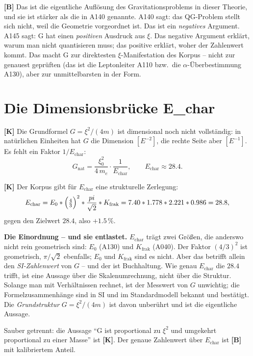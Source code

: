 \textbf{[B]} Das ist die eigentliche Auflösung des Gravitationsproblems in
dieser Theorie, und sie ist stärker als die in A140 genannte. A140 sagt: das
QG-Problem stellt sich nicht, weil die Geometrie vorgeordnet ist. Das ist ein
\emph{negatives} Argument. A145 sagt: G hat einen \emph{positiven} Ausdruck aus
$\xi$. Das negative Argument erklärt, warum man nicht quantisieren muss; das
positive erklärt, woher der Zahlenwert kommt. Das macht G zur direktesten
$\xi$-Manifestation des Korpus -- nicht zur genauest geprüften (das ist die
Leptonleiter A110 bzw.\ die $\alpha$-Überbestimmung A130), aber zur
unmittelbarsten in der Form.

\section{Die Dimensionsbrücke E\_char}

\textbf{[K]} Die Grundformel $G=\xi^2/(4m)$ ist dimensional noch nicht
vollständig: in natürlichen Einheiten hat $G$ die Dimension $[E^{-2}]$, die
rechte Seite aber $[E^{-1}]$. Es fehlt ein Faktor $1/E_\text{char}$:
\[
  G_\text{nat} = \frac{\xi_0^2}{4\,m_e}\cdot\frac{1}{E_\text{char}},
  \qquad E_\text{char}\approx 28{.}4 .
\]

\textbf{[K]} Der Korpus gibt für $E_\text{char}$ eine strukturelle Zerlegung:
\[
  E_\text{char} = E_0\cdot\Bigl(\tfrac43\Bigr)^2\cdot\frac{\pi}{\sqrt2}\cdot
  K_\text{frak} = 7{.}40\cdot 1{.}778\cdot 2{.}221\cdot 0{.}986 = 28{.}8 ,
\]
gegen den Zielwert $28{.}4$, also $+1{.}5\,\%$.

\textbf{Die Einordnung -- und sie entlastet.} $E_\text{char}$ trägt zwei Größen,
die anderswo nicht rein geometrisch sind: $E_0$ (A130) und $K_\text{frak}$
(A040). Der Faktor $(4/3)^2$ ist geometrisch, $\pi/\sqrt2$ ebenfalls; $E_0$ und
$K_\text{frak}$ sind es nicht. Aber das betrifft allein den \emph{SI-Zahlenwert}
von $G$ -- und der ist Buchhaltung. Wie genau $E_\text{char}$ die $28{.}4$
trifft, ist eine Aussage über die Skalenumrechnung, nicht über die Struktur.
Solange man mit Verhältnissen rechnet, ist der Messwert von $G$ unwichtig; die
Formelzusammenhänge sind in SI und im Standardmodell bekannt und bestätigt. Die
\emph{Grundstruktur} $G = \xi^2/(4m)$ ist davon unberührt und ist die eigentliche
Aussage.

Sauber getrennt: die Aussage \enquote{G ist proportional zu $\xi^2$ und
umgekehrt proportional zu einer Masse} ist \textbf{[K]}. Der genaue
Zahlenwert über $E_\text{char}$ ist \textbf{[B]} mit kalibriertem Anteil.

